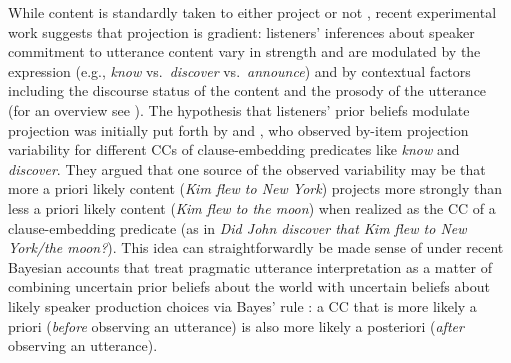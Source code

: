 \documentclass[11pt,fleqn]{article}
\newcommand{\6}{\mbox{$[\hspace*{-.6mm}[$}}
\newcommand{\9}{\mbox{$]\hspace*{-.6mm}]$}}
\begin{document}
While content is standardly taken to either project or not \cite{beaver-geurts-sep}, recent experimental work suggests that projection is gradient: listeners' inferences about speaker commitment to utterance content vary in strength and are modulated by the expression (e.g., {\em know} vs.\ {\em discover} vs.\ {\em announce}) and by contextual factors including the discourse status of the content and the prosody of the utterance (for an overview see ). The hypothesis that listeners' prior beliefs modulate projection was initially put forth by  and , who observed by-item projection variability for different CCs of clause-embedding predicates like \emph{know} and \emph{discover}. They argued that one source of the observed variability may be that more a priori likely content ({\em Kim flew to New York}) projects more strongly than less a priori likely content  ({\em Kim flew to the moon}) when realized as the CC of a clause-embedding predicate (as in \emph{Did John discover that Kim flew to New York/the moon?}). This idea can straightforwardly be made sense of under recent Bayesian accounts that treat pragmatic utterance interpretation as a matter of combining uncertain prior beliefs about the world with uncertain beliefs about likely speaker production choices via Bayes' rule \cite{GoodmanFrank2016, degen-etal2015}: a CC that is more likely a priori (\emph{before} observing an utterance) is also more likely a posteriori (\emph{after} observing an utterance).


\end{document}
